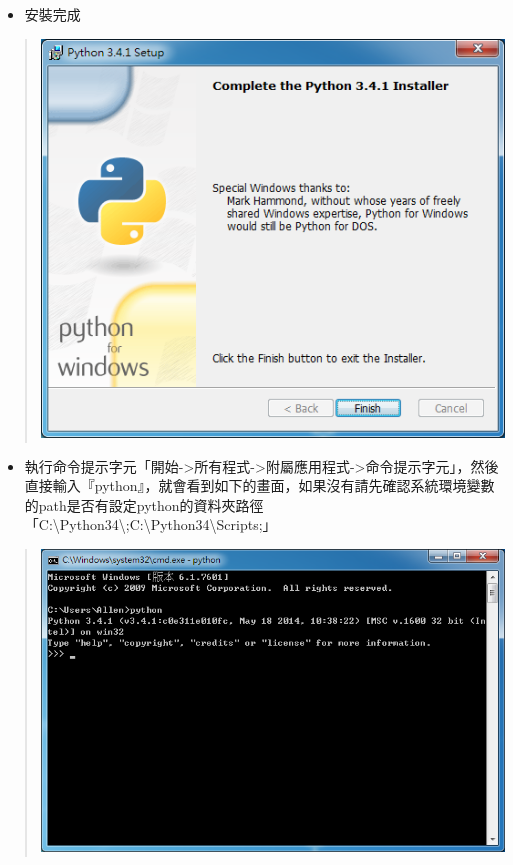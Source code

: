\documentclass[letterpaper,10pt,english]{sphinxmanual}
\begin{document}
\begin{itemize}
\item {} 
安裝完成

\end{itemize}
\begin{quote}

\includegraphics{Python-Install-005.png}
\end{quote}
\begin{itemize}
\item {} 
執行命令提示字元「開始-\textgreater{}所有程式-\textgreater{}附屬應用程式-\textgreater{}命令提示字元」，然後直接輸入『python』，就會看到如下的畫面，如果沒有請先確認系統環境變數的path是否有設定python的資料夾路徑「C:\textbackslash{}Python34\textbackslash{};C:\textbackslash{}Python34\textbackslash{}Scripts;」

\end{itemize}
\begin{quote}

\includegraphics{Python-Install-006.png}
\end{quote}
\end{document}
